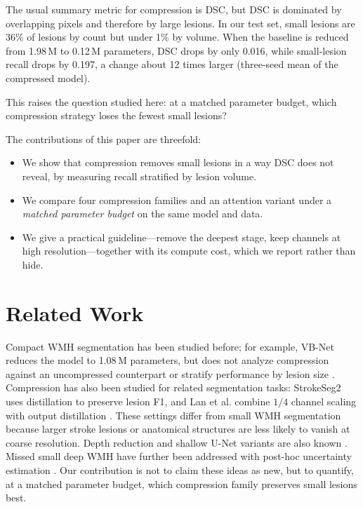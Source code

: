 \documentclass[conference]{IEEEtran}
\begin{document}
The usual summary metric for compression is DSC, but DSC is dominated by
overlapping pixels and therefore by large lesions. In our test set, small
lesions are 36\% of lesions by count but under 1\% by volume. When the
baseline is reduced from 1.98\,M to 0.12\,M parameters, DSC drops by only
0.016, while small-lesion recall drops by 0.197, a change about 12 times
larger (three-seed mean of the compressed model).

This raises the question studied here: at a matched parameter budget,
which compression strategy loses the fewest small lesions?

The contributions of this paper are threefold:
\begin{itemize}
  \item We show that compression removes small lesions in a way DSC does
        not reveal, by measuring recall stratified by lesion volume.
  \item We compare four compression families and an attention variant
        under a \emph{matched parameter budget} on the same model and data.
  \item We give a practical guideline---remove the deepest stage, keep
        channels at high resolution---together with its compute cost,
        which we report rather than hide.
\end{itemize}

\section{Related Work}

Compact WMH segmentation has been studied before; for example, VB-Net
reduces the model to 1.08\,M parameters, but does not analyze compression
against an uncompressed counterpart or stratify performance by lesion
size \cite{zhu2022vbnet}. Compression has also been studied for related
segmentation tasks: StrokeSeg2 uses distillation to preserve lesion F1,
and Lan et al. combine $1/4$ channel scaling with output distillation
\cite{mahe2026strokeseg,lan2026kd}. These settings differ from small WMH
segmentation because larger stroke lesions or anatomical structures are
less likely to vanish at coarse resolution. Depth reduction and shallow
U-Net variants are also known \cite{zhou2020unetpp}. Missed
small deep WMH have further been addressed with post-hoc uncertainty
estimation \cite{philps2025}. Our contribution is not to claim these
ideas as new, but to quantify, at a matched parameter budget, which
compression family preserves small lesions best.
\end{document}
